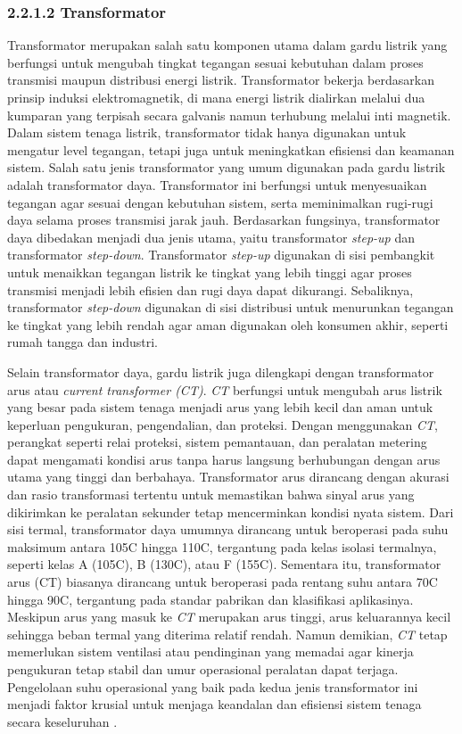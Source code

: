 \subsubsection{2.2.1.2 Transformator}

Transformator merupakan salah satu komponen utama dalam gardu listrik yang berfungsi untuk mengubah tingkat tegangan sesuai kebutuhan dalam proses transmisi maupun distribusi energi listrik. Transformator bekerja berdasarkan prinsip induksi elektromagnetik, di mana energi listrik dialirkan melalui dua kumparan yang terpisah secara galvanis namun terhubung melalui inti magnetik. Dalam sistem tenaga listrik, transformator tidak hanya digunakan untuk mengatur level tegangan, tetapi juga untuk meningkatkan efisiensi dan keamanan sistem. Salah satu jenis transformator yang umum digunakan pada gardu listrik adalah transformator daya. Transformator ini berfungsi untuk menyesuaikan tegangan agar sesuai dengan kebutuhan sistem, serta meminimalkan rugi-rugi daya selama proses transmisi jarak jauh. Berdasarkan fungsinya, transformator daya dibedakan menjadi dua jenis utama, yaitu transformator \emph{step-up} dan transformator \emph{step-down}. Transformator \emph{step-up} digunakan di sisi pembangkit untuk menaikkan tegangan listrik ke tingkat yang lebih tinggi agar proses transmisi menjadi lebih efisien dan rugi daya dapat dikurangi. Sebaliknya, transformator \emph{step-down} digunakan di sisi distribusi untuk menurunkan tegangan ke tingkat yang lebih rendah agar aman digunakan oleh konsumen akhir, seperti rumah tangga dan industri.

Selain transformator daya, gardu listrik juga dilengkapi dengan transformator arus atau \emph{current transformer (CT)}. \emph{CT} berfungsi untuk mengubah arus listrik yang besar pada sistem tenaga menjadi arus yang lebih kecil dan aman untuk keperluan pengukuran, pengendalian, dan proteksi. Dengan menggunakan \emph{CT}, perangkat seperti relai proteksi, sistem pemantauan, dan peralatan metering dapat mengamati kondisi arus tanpa harus langsung berhubungan dengan arus utama yang tinggi dan berbahaya. Transformator arus dirancang dengan akurasi dan rasio transformasi tertentu untuk memastikan bahwa sinyal arus yang dikirimkan ke peralatan sekunder tetap mencerminkan kondisi nyata sistem. Dari sisi termal, transformator daya umumnya dirancang untuk beroperasi pada suhu maksimum antara 105\textdegree{}C hingga 110\textdegree{}C, tergantung pada kelas isolasi termalnya, seperti kelas A (105\textdegree{}C), B (130\textdegree{}C), atau F (155\textdegree{}C). Sementara itu, transformator arus (CT) biasanya dirancang untuk beroperasi pada rentang suhu antara 70\textdegree{}C hingga 90\textdegree{}C, tergantung pada standar pabrikan dan klasifikasi aplikasinya. Meskipun arus yang masuk ke \emph{CT} merupakan arus tinggi, arus keluarannya kecil sehingga beban termal yang diterima relatif rendah. Namun demikian, \emph{CT} tetap memerlukan sistem ventilasi atau pendinginan yang memadai agar kinerja pengukuran tetap stabil dan umur operasional peralatan dapat terjaga. Pengelolaan suhu operasional yang baik pada kedua jenis transformator ini menjadi faktor krusial untuk menjaga keandalan dan efisiensi sistem tenaga secara keseluruhan \cite{stevenson1994power}.


